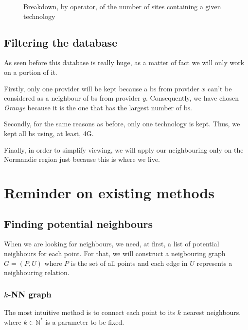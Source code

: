 \documentclass[lettersize,journal,english]{IEEEtran}
\begin{document}
\begin{figure}[!b]
    \centering
    \caption{Breakdown, by operator, of the number of sites containing a given technology}
    \label{fig:data_technos}
\end{figure}

\subsection{Filtering the database}
As seen before this database is really huge, as a matter of fact we will only work on a portion of it.

Firstly, only one provider will be kept because a \acrshort{bs} from provider $x$ can't be considered as a neighbour of \acrshort{bs} from provider $y$.
Consequently, we have chosen \emph{Orange} because it is the one that has the largest number of \acrshort{bs}.

Secondly, for the same reasons as before, only one technology is kept. Thus, we kept all \acrshort{bs} using, at least, 4G.

Finally, in order to simplify viewing, we will apply our neighbouring only on the Normandie region just because this is where we live.
\section{Reminder on existing methods}
\subsection{Finding potential neighbours}
When we are looking for neighbours, we need, at first, a list of potential neighbours for each point.
For that, we will construct a neigbouring graph $G = (P, U)$ where $P$ is the set of all points and each edge in $U$ represents a neighbouring relation.

\subsubsection{$k$-NN graph}
The most intuitive method is to connect each point to its $k$ nearest neighbours, where $k \in \mathbb{N}^*$ is a parameter to be fixed. 
\end{document}
